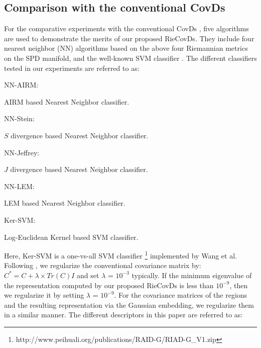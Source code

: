 \documentclass[review]{elsarticle}
\begin{document}
\subsection{Comparison with the conventional CovDs}
	For the comparative experiments with the conventional CovDs \cite{wang2012covariance}, five algorithms are used to demonstrate the merits of our proposed RieCovDs. They include four nearest neighbor (NN) algorithms based on the above four Riemannian metrics on the SPD manifold, and the well-known SVM classifier \cite{chang2011libsvm}. The different classifiers tested in our experiments are referred to as: \\
\begin{bfseries}NN-AIRM:\end{bfseries} AIRM based Nearest Neighbor classifier.\\
\begin{bfseries}NN-Stein:\end{bfseries} $S$ divergence based Nearest Neighbor classifier.\\
\begin{bfseries}NN-Jeffrey:\end{bfseries} $J$ divergence based Nearest Neighbor classifier.\\
\begin{bfseries}NN-LEM:\end{bfseries} LEM based Nearest Neighbor classifier.\\
\begin{bfseries}Ker-SVM:\end{bfseries} Log-Euclidean Kernel \cite{wang2012covariance} based SVM classifier.

	Here, Ker-SVM is a one-vs-all SVM classifier \footnote{http://www.peihuali.org/publications/RAID-G/RIAD-G\_V1.zip} implemented by Wang et al. Following \cite{wang2012covariance}, we regularize the conventional covariance matrix by: $C^{*} = C + \lambda\times Tr(C)I$ and set $\lambda$ = $10^{-3}$ typically. If the minimum eigenvalue of the representation computed by our proposed RieCovDs is less than $10^{-9}$, then we regularize it by setting $\lambda$ = $10^{-9}$. For the covariance matrices of the regions and the resulting representation via the Gaussian embedding, we regularize them in a similar manner. The different descriptors in this paper are referred to as:
	
\end{document}
